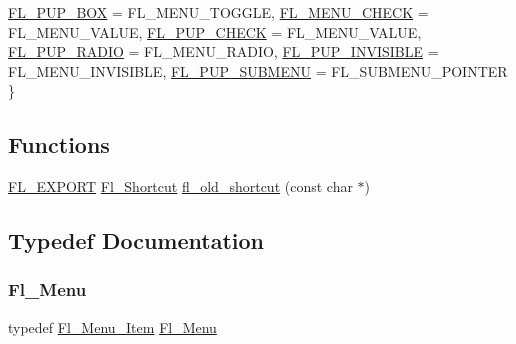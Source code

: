 \begin{DoxyCompactItemize}
\newline
\hyperlink{_fl___menu___item_8_h_a385c44f6fb256e5716a2302a5b940388a47bdeaf71b6f3ef9b4e3d96dbad14d63}{F\+L\+\_\+\+P\+U\+P\+\_\+\+B\+OX} = F\+L\+\_\+\+M\+E\+N\+U\+\_\+\+T\+O\+G\+G\+LE, 
\hyperlink{_fl___menu___item_8_h_a385c44f6fb256e5716a2302a5b940388a8c3775c6ae47b7274f5611727c725ab2}{F\+L\+\_\+\+M\+E\+N\+U\+\_\+\+C\+H\+E\+CK} = F\+L\+\_\+\+M\+E\+N\+U\+\_\+\+V\+A\+L\+UE, 
\hyperlink{_fl___menu___item_8_h_a385c44f6fb256e5716a2302a5b940388a8336aa02474ff03df7806f50b9f29cfb}{F\+L\+\_\+\+P\+U\+P\+\_\+\+C\+H\+E\+CK} = F\+L\+\_\+\+M\+E\+N\+U\+\_\+\+V\+A\+L\+UE, 
\hyperlink{_fl___menu___item_8_h_a385c44f6fb256e5716a2302a5b940388a6c344b93f6ed791acd4201b5141e3807}{F\+L\+\_\+\+P\+U\+P\+\_\+\+R\+A\+D\+IO} = F\+L\+\_\+\+M\+E\+N\+U\+\_\+\+R\+A\+D\+IO, 
\newline
\hyperlink{_fl___menu___item_8_h_a385c44f6fb256e5716a2302a5b940388a754349b3f6290659391a0b7532f01e80}{F\+L\+\_\+\+P\+U\+P\+\_\+\+I\+N\+V\+I\+S\+I\+B\+LE} = F\+L\+\_\+\+M\+E\+N\+U\+\_\+\+I\+N\+V\+I\+S\+I\+B\+LE, 
\hyperlink{_fl___menu___item_8_h_a385c44f6fb256e5716a2302a5b940388a2b2cd816b3f61a8117d85aa5bc83acf4}{F\+L\+\_\+\+P\+U\+P\+\_\+\+S\+U\+B\+M\+E\+NU} = F\+L\+\_\+\+S\+U\+B\+M\+E\+N\+U\+\_\+\+P\+O\+I\+N\+T\+ER
 \}
\end{DoxyCompactItemize}
\subsection*{Functions}
\begin{DoxyCompactItemize}
\item 
\hyperlink{_fl___export_8_h_aa9ba29a18aee9d738370a06eeb4470fc}{F\+L\+\_\+\+E\+X\+P\+O\+RT} \hyperlink{fl__types_8h_a37ec1cd050a604a45dff00efba45609d}{Fl\+\_\+\+Shortcut} \hyperlink{_fl___menu___item_8_h_a3126c385bf20f21725bf2c3d0fef6e1c}{fl\+\_\+old\+\_\+shortcut} (const char $\ast$)
\end{DoxyCompactItemize}


\subsection{Typedef Documentation}
\mbox{\label{_fl___menu___item_8_h_a5d62cb6d3879dca9d132cee821d54896}} 
\subsubsection{\texorpdfstring{Fl\+\_\+\+Menu}{Fl\_Menu}}
{\footnotesize\ttfamily typedef \hyperlink{struct_fl___menu___item}{Fl\+\_\+\+Menu\+\_\+\+Item} \hyperlink{_fl___menu___item_8_h_a5d62cb6d3879dca9d132cee821d54896}{Fl\+\_\+\+Menu}}



